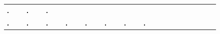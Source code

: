 \documentclass[letterpaper]{article} %
\begin{document}
\begin{figure}[!h]
\begin{tabular}{ C{1.07cm}C{1.07cm}C{1.07cm}C{1.07cm}C{1.07cm}C{1.07cm}C{1.07cm}C{1.07cm}C{1.07cm}C{1.07cm}C{1.07cm}C{1.07cm}C{1.07cm}C{1.07cm}C{1.07cm}C{1.07cm} }
    \includegraphics[width=0.070\textwidth]{"images/supp_fig_mnist/seq_2/pred_5"}&
    \includegraphics[width=0.070\textwidth]{"images/supp_fig_mnist/seq_2/pred_6"}&
    \includegraphics[width=0.070\textwidth]{"images/supp_fig_mnist/seq_2/pred_7"}\\
    
    \includegraphics[width=0.070\textwidth]{"images/supp_fig_mnist/seq_3/t_m_3"} &
    \includegraphics[width=0.070\textwidth]{"images/supp_fig_mnist/seq_3/t_m_2"} &
    \includegraphics[width=0.070\textwidth]{"images/supp_fig_mnist/seq_3/t_m_1"} &
    \includegraphics[width=0.070\textwidth]{"images/supp_fig_mnist/seq_3/t_m_0"} &
    \includegraphics[width=0.070\textwidth]{"images/supp_fig_mnist/seq_3/pred_0"}&
    \includegraphics[width=0.070\textwidth]{"images/supp_fig_mnist/seq_3/pred_1"}&
    \includegraphics[width=0.070\textwidth]{"images/supp_fig_mnist/seq_3/pred_2"}&
    \includegraphics[width=0.070\textwidth]{"images/supp_fig_mnist/seq_3/pred_3"}&

\end{tabular}
\end{figure}
\end{document}
